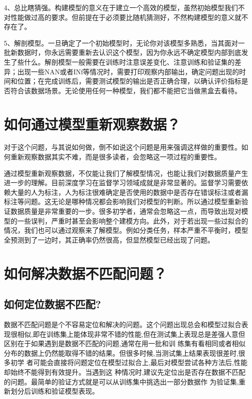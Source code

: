 ​
4、总比瞎猜强。构建模型的意义在于建立一个高效的模型，虽然初始模型我们不对性能做过高的要求。但前提在于必须要比随机猜测好，不然构建模型的意义就不存在了。

​
5、解剖模型。一旦确定了一个初始模型时，无论你对该模型多熟悉，当其面对一批新数据时，你永远需要重新去认识这个模型，因为你永远不确定模型内部到底发生了些什么。解剖模型一般需要在训练时注意误差变化、注意训练和验证集的差异；出现一些NAN或者INf等情况时，需要打印观察内部输出，确定问题出现的时间和位置；在完成训练后，需要测试模型的输出是否正确合理，以确认评价指标是否符合该数据场景。无论使用任何一种模型，我们都不能把它当做黑盒去看待。

\section{如何通过模型重新观察数据？}\label{ux5982ux4f55ux901aux8fc7ux6a21ux578bux91cdux65b0ux89c2ux5bdfux6570ux636e}

​
对于这个问题，与其说如何做，倒不如说这个问题是用来强调这样做的重要性。如何重新观察数据其实不难，而是很多读者，会忽略这一项过程的重要性。

​
通过模型重新观察数据，不仅能让我们了解模型情况，也能让我们对数据质量产生进一步的理解。目前深度学习在监督学习领域成就是非常显著的。监督学习需要依赖大量的人为标注，人为标注很难确定是否使用的数据中是否存在错误标注或者漏标注等问题。这无论是哪种情况都会影响我们对模型的判断。所以通过模型重新验证数据质量是非常重要的一步。很多初学者，通常会忽略这一点，而导致出现对模型的一些误判，严重时甚至会影响整个建模方向。此外，对于若出现一些过拟合的情况，我们也可以通过观察来了解模型。例如分类任务，样本严重不平衡时，模型全预测到了一边时，其正确率仍然很高，但显然模型已经出现了问题。

\section{如何解决数据不匹配问题？}\label{ux5982ux4f55ux89e3ux51b3ux6570ux636eux4e0dux5339ux914dux95eeux9898}

\subsection{如何定位数据不匹配?}\label{ux5982ux4f55ux5b9aux4f4dux6570ux636eux4e0dux5339ux914d}

​
数据不匹配问题是个不容易定位和解决的问题。这个问题出现总会和模型过拟合表现很相似,即在训练集上能体现非常不错的性能,但在测试集上表现总是差强人意但区别在于如果遇到是数据不匹配的问题,通常在用一批和训
练集有看相同或者相似分布的数据上仍然能取得不错的结果。但很多时候,当测试集上结果表现很差时,很多初学
者可能会直接将问题定位在模型过拟合上,最后对模型尝试各种方法后,性能却始终不能得到有效提升。当遇到这
种情况时,建议先定位出是否存在数据不匹配的问题。最简单的验证方式就是可以从训练集中挑选出一部分数据作
为验证集,重新划分后训练和验证模型表现。

